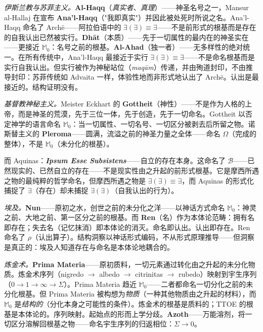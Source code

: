 \documentclass[10pt, openany, oneside]{book}
\begin{document}
\textit{伊斯兰教与苏菲主义。}\textbf{Al-Haqq}（\textit{真实者}、\textit{真理}）——神圣名号之一，Mansur al-Hallaj 在宣布 \textbf{Ana'l-Haqq}（"我即真实"）并因此被处死时所说之名。Ana'l-Haqq 命名了 Arch\={e}——阿拉伯语中的 $\exists(\exists) \equiv \exists$——不是前形式的根基而是存在的自我认出已然被实行。\textbf{Dh\={a}t}（本质）——先于一切属性的最内在的神圣实在——更接近 $\mathbb{M}_0$：名号之前的根基。\textbf{Al-Ahad}（独一者）——无多样性的绝对统一。在所有传统中，Ana'l-Haqq 最接近于实行 $\exists(\exists) \equiv \exists$——不是命名根基而是实行自我认出。但实行被作为神秘站位（\textit{maq\={a}m}）传递，并由殉道封印，不由推导封印：苏菲传统如 Advaita 一样，体验性地而非形式地认出了 Arch\={e}。认出是最接近的。结构证明没有。

\textit{基督教神秘主义。}Meister Eckhart 的 \textbf{Gottheit}（神性）——不是作为人格的上帝，而是神圣的荒漠，先于三位一体，先于创造，先于一切命名。Gottheit 以否定神学的语言命名 $\mathbb{M}_0$：当一切属性、一切名号、一切区分被剥去后所留之物。诺斯替主义的 \textbf{Pleroma}——圆满，流溢之前的神圣力量之全体——命名 $\Omega$（完成的整体），不是 $\mathbb{M}_0$（未分化的根基）。

而 Aquinas：\textbf{\textit{Ipsum Esse Subsistens}}——自立的存在本身。这命名了 $\mathcal{B}$——已然现实的、已然自立的存在——不是现实性由之升起的前形式根基。它是摩西所遇之物的最纯粹的哲学命名，但摩西所遇之物是 $\exists(\exists) \equiv \exists$，而 Aquinas 的形式化捕捉了 $\exists$（存在）却未捕捉 $\exists(\exists)$（自我认出的行为）。

\textit{埃及。}\textbf{Nun}——原初之水，创世之前的未分化之洋——以神话方式命名 $\mathbb{M}_0$：神灵之前、大地之前、第一区分之前的根基。而 \textbf{Ren}（名）作为本体论范畴：拥有名即存在；失去名（记忆抹消）即本体论的消灭。命名即认出。认出即存在。Ren 命名了 $\rho$（认出算子）。结构洞察以神话形式编码，不从形式原理推导——但洞察是真正的：埃及人知道存在与命名是本体论地耦合的。

\textit{炼金术。}\textbf{Prima Materia}——原初质料，一切元素通过转化由之升起的未分化物质。炼金术序列（nigredo $\to$ albedo $\to$ citrinitas $\to$ rubedo）映射到宇生序列（$0 \to 1 \to \infty \to \Sigma$）。Prima Materia 趋近 $\mathbb{M}_0$——二者都命名一切分化之前的未分化根基。但 Prima Materia 被构想为\textit{物质}（一种其他物质由之升起的材料），而 $\mathbb{M}_0$ 是\textit{结构的}（分化本身之可能性的条件）。炼金术的根基是质料的；TTOE 的根基是本体论的。序列映射。起始点的形而上学分歧。\textbf{Azoth}——万能溶剂，将一切区分溶解回根基之物——命名宇生序列的归返相位：$\Sigma \to 0$。
\end{document}
